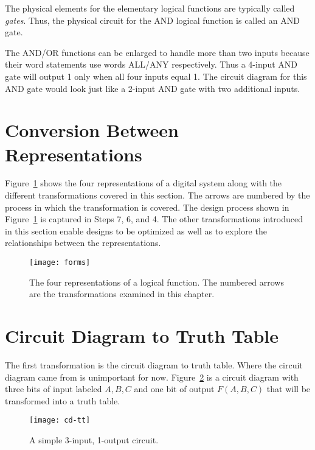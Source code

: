 \label{page:elf2}

The physical elements for the elementary logical functions are
typically called \textit{gates}.   Thus, the physical circuit for
the AND logical function is called an AND gate.

The AND/OR functions can be enlarged to handle more than
two inputs because their word statements use words ALL/ANY
respectively.  Thus a 4-input AND gate will output 1
only when all four inputs equal 1.  The circuit diagram for
this AND gate would look just like a 2-input AND gate with
two additional inputs.

\section{Conversion Between Representations}
Figure~\ref{fig:representationsForms} shows the four representations of a digital system
along with the different transformations covered in this section.
The arrows are numbered by the process in which the transformation is
covered.  The design process shown in Figure~\ref{fig:representationsForms} is captured
in Steps 7, 6, and 4.  The other transformations introduced in this
section enable designs to be optimized as well as to explore
the relationships between the representations.

\begin{figure}[ht]
    \texttt{[image: forms]}
    \caption{The four representations of a logical function.  The
    numbered arrows are the transformations examined in this chapter.}
    \label{fig:representationsForms}
\end{figure}

\section{Circuit Diagram to Truth Table}

The first transformation is the circuit diagram to truth table.
Where the circuit diagram came from is unimportant for now.
Figure~\ref{fig:representationsCD-TT} is a circuit diagram with three bits of
input labeled $A,B,C$ and one bit of output $F(A,B,C)$ that will
be transformed into a truth table.

\begin{figure}[ht]
    \texttt{[image: cd-tt]}
    \caption{A simple 3-input, 1-output circuit.}
    \label{fig:representationsCD-TT}
\end{figure}

